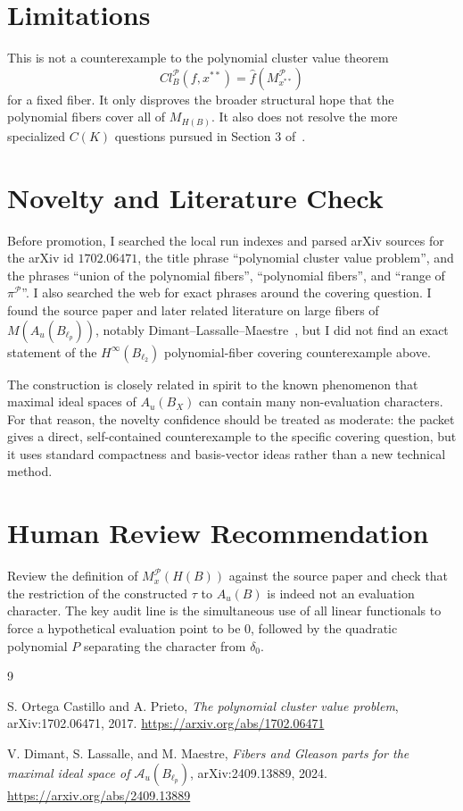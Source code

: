 \documentclass[11pt]{article}
\newcommand{\Ball}{B}
\newcommand{\Au}{A_u}
\newcommand{\M}{M}
\newcommand{\PP}{\mathcal P}
\begin{document}
\section*{Limitations}

This is not a counterexample to the polynomial cluster value theorem
\[
  Cl_{\Ball}^{\PP}(f,x^{**})=\widehat f(\M_{x^{**}}^{\PP})
\]
for a fixed fiber.  It only disproves the broader structural hope that the
polynomial fibers cover all of \(\M_{H(\Ball)}\).  It also does not resolve the
more specialized \(C(K)\) questions pursued in Section 3 of~\cite{OP}.

\section*{Novelty and Literature Check}

Before promotion, I searched the local run indexes and parsed arXiv sources
for the arXiv id \(1702.06471\), the title phrase ``polynomial cluster value
problem'', and the phrases ``union of the polynomial fibers'', ``polynomial
fibers'', and ``range of \(\pi^{\PP}\)''.  I also searched the web for exact
phrases around the covering question.  I found the source paper and later
related literature on large fibers of \(\M(\Au(B_{\ell_p}))\), notably
Dimant--Lassalle--Maestre~\cite{DLM}, but I did not find an exact statement of
the \(H^\infty(B_{\ell_2})\) polynomial-fiber covering counterexample above.

The construction is closely related in spirit to the known phenomenon that
maximal ideal spaces of \(\Au(B_X)\) can contain many non-evaluation
characters.  For that reason, the novelty confidence should be treated as
moderate: the packet gives a direct, self-contained counterexample to the
specific covering question, but it uses standard compactness and basis-vector
ideas rather than a new technical method.

\section*{Human Review Recommendation}

Review the definition of \(\M_x^{\PP}(H(\Ball))\) against the source paper and
check that the restriction of the constructed \(\tau\) to \(\Au(\Ball)\) is
indeed not an evaluation character.  The key audit line is the simultaneous
use of all linear functionals to force a hypothetical evaluation point to be
0, followed by the quadratic polynomial \(P\) separating the character from
\(\delta_0\).

\begin{thebibliography}{9}

S. Ortega Castillo and A. Prieto,
\emph{The polynomial cluster value problem},
arXiv:1702.06471, 2017.
\url{https://arxiv.org/abs/1702.06471}

V. Dimant, S. Lassalle, and M. Maestre,
\emph{Fibers and Gleason parts for the maximal ideal space of
\(\mathcal A_u(B_{\ell_p})\)},
arXiv:2409.13889, 2024.
\url{https://arxiv.org/abs/2409.13889}

\end{thebibliography}
\end{document}
